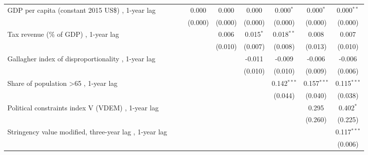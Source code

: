 \begin{table}[htbp]
\begin{tabular}{lcccccccc}
      GDP per capita (constant 2015 US\$) , 1-year lag                      &              &              & 0.000        & 0.000   & 0.000        & 0.000$^{*}$   & 0.000$^{*}$   & 0.000$^{**}$\\   
                                                                            &              &              & (0.000)      & (0.000) & (0.000)      & (0.000)       & (0.000)       & (0.000)\\   
      Tax revenue (\% of GDP) , 1-year lag                                  &              &              &              & 0.006   & 0.015$^{*}$  & 0.018$^{**}$  & 0.008         & 0.007\\   
                                                                            &              &              &              & (0.010) & (0.007)      & (0.008)       & (0.013)       & (0.010)\\   
      Gallagher index of disproportionality , 1-year lag                    &              &              &              &         & -0.011       & -0.009        & -0.006        & -0.006\\   
                                                                            &              &              &              &         & (0.010)      & (0.010)       & (0.009)       & (0.006)\\   
      Share of population >65 , 1-year lag                                  &              &              &              &         &              & 0.142$^{***}$ & 0.157$^{***}$ & 0.115$^{***}$\\   
                                                                            &              &              &              &         &              & (0.044)       & (0.040)       & (0.038)\\   
      Political constraints index V (VDEM) , 1-year lag                     &              &              &              &         &              &               & 0.295         & 0.402$^{*}$\\   
                                                                            &              &              &              &         &              &               & (0.260)       & (0.225)\\   
      Stringency value modified, three-year lag , 1-year lag                &              &              &              &         &              &               &               & 0.117$^{***}$\\   
                                                                            &              &              &              &         &              &               &               & (0.006)\\   

\end{tabular}
\end{table}
